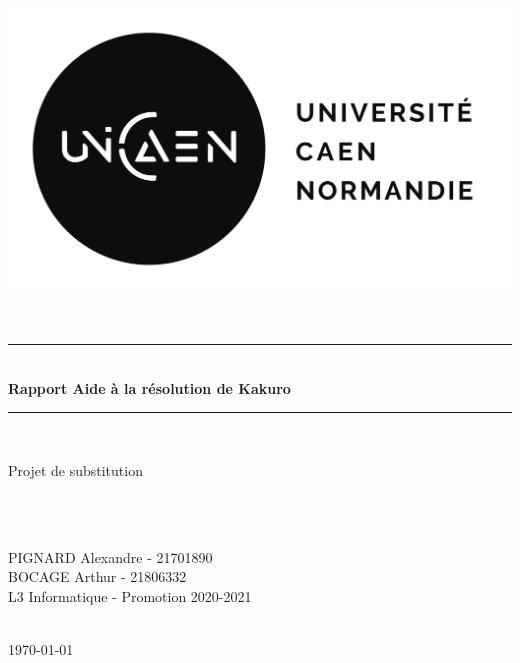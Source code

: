 \documentclass[french,12pt]{article}
\begin{document}
\begin{titlepage}

\newcommand{\HRule}{\rule{\linewidth}{0.5mm}}
\setlength{\topmargin}{0in}
\begin{minipage}{0.4\textwidth}
	\begin{flushleft} \large
		\hspace*{-0.5cm}
		\includegraphics[scale=0.20]{./ressources/logo-unicaen.jpg}
	\end{flushleft}
\end{minipage}
\center
\textsc{\large }\\[0.5cm]
\HRule \\[0.4cm]
{ \huge \bfseries Rapport Aide à la résolution de Kakuro}\\[0.4cm]
\HRule \\[1cm]
\begin{minipage}{\textwidth}
	\begin{flushright} \huge
		\center
		Projet de substitution
	\end{flushright}
\end{minipage}\\[1cm]
\textsc{\large }\\[1cm]
\begin{minipage}{\textwidth}
	\begin{flushright} \large
		\center
		PIGNARD Alexandre - 21701890\\BOCAGE Arthur - 21806332
		\\[1cm]
		L3 Informatique - Promotion 2020-2021
	\end{flushright}
\end{minipage}
\textsc{\large }\\[2cm]
{\large \today}\\[0.5cm]
\vfill
\end{titlepage}
\end{document}
